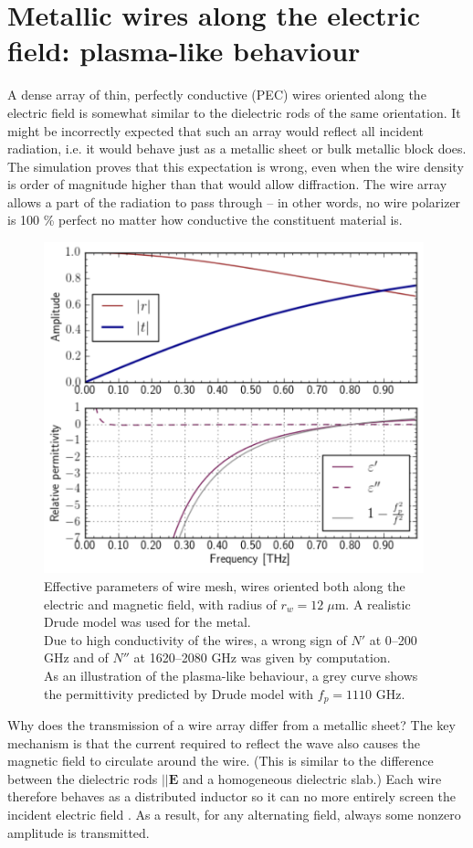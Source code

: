 \documentclass[letterpaper,12pt]{report}
\begin{document}
\section{Metallic wires along the electric field: plasma-like behaviour}
A dense array of thin, perfectly conductive (PEC) wires oriented along the electric field is somewhat similar to the dielectric rods of the same orientation. It might be incorrectly expected that such an array would reflect all incident radiation, i.e. it would behave just as a metallic sheet or bulk metallic block does. The simulation proves that this expectation is wrong, even when the wire density is order of magnitude higher than that would allow diffraction. The wire array allows a part of the radiation to pass through -- in other words, no wire polarizer is 100 \% perfect no matter how conductive the constituent material is.
\begin{figure}[ht]  \caption{Effective parameters of wire mesh, wires oriented both along the electric and magnetic field, with radius of $r_w = 12\;\mu$m. A realistic Drude model was used for the metal.\\ Due to high conductivity of the wires, a wrong sign of $N'$ at 0--200 GHz and of $N''$ at 1620--2080 GHz was given by computation.\\As an illustration of the plasma-like behaviour, a grey curve shows the permittivity predicted by Drude model with $f_p = 1110$ GHz.}
\label{fg_wire_fdtd} \centering 
\includegraphics[width=11cm]{img/XCylWire_a100r4.pdf}
\end{figure}

Why does the transmission of a wire array differ from a metallic sheet? The key mechanism is that the current required to reflect the wave also causes the magnetic field to circulate around the wire. (This is similar to the difference between the dielectric rods $||\mathbf E$ and a homogeneous dielectric slab.) Each wire therefore behaves as a distributed inductor so it can no more entirely screen the incident electric field \cite{pendry1996extremely}. As a result, for any alternating field, always some nonzero amplitude is transmitted.
\end{document}
